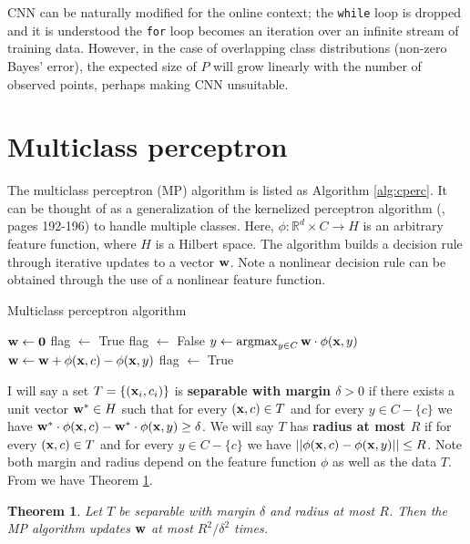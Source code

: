 \documentclass{article}
\newcommand{\R}{ \mbox{${\mathbb R}$}}
\newcommand{\argmax}{\operatornamewithlimits{argmax}}
\newtheorem{theorem}{Theorem}
\begin{document}
CNN can be naturally modified for the online context; the \texttt{while} loop is dropped and it is understood the \texttt{for} loop becomes an iteration over an infinite stream of training data. However, in the case of overlapping class distributions (non-zero Bayes' error), the expected size of $P$ will grow linearly with the number of observed points, perhaps making CNN unsuitable.

\section{Multiclass perceptron}
The multiclass perceptron (MP) algorithm \cite{CollinsPerceptron} is listed as Algorithm \ref{alg:cperc}. It can be thought of as a generalization of the kernelized perceptron algorithm (\cite{bishop-2006}, pages 192-196) to handle multiple classes. Here, $\phi:\R^d \times C \rightarrow H$ is an arbitrary feature function, where $H$ is a Hilbert space. The algorithm builds a decision rule through iterative updates to a vector ${\bf w}$. Note a nonlinear decision rule can be obtained through the use of a nonlinear feature function.

\begin{algorithm}
\caption{Multiclass perceptron algorithm}
\label{alg:cperc}
\begin{algorithmic}
\STATE ${\bf w} \leftarrow {\bf 0}$
\STATE flag $\leftarrow$ True
\STATE flag $\leftarrow$ False
	\STATE $y \gets \argmax_{y \in C} {\bf w} \cdot \phi({\bf x},y)$
		\STATE ${\bf w} \leftarrow {\bf w} + \phi({\bf x},c)-\phi({\bf x},y)$
		\STATE flag $\leftarrow$ True
	\ENDIF
\ENDFOR
\ENDWHILE
\end{algorithmic}
\end{algorithm}

I will say a set $T=\{({\bf x}_i,c_i)\}$ is \textbf{separable with margin $\delta > 0$} if there exists a unit vector ${\bf w}^* \in H$ such that for every $({\bf x},c) \in T$ and for every $y \in C-\{c\}$ we have ${\bf w}^* \cdot \phi({\bf x},c) - {\bf w}^* \cdot \phi({\bf x},y) \geq \delta$. We will say $T$ has \textbf{radius at most $R$} if for every $({\bf x},c) \in T$ and for every $y \in C-\{c\}$ we have $||\phi({\bf x},c) - \phi({\bf x},y)|| \leq R$. Note both margin and radius depend on the feature function $\phi$ as well as the data $T$. From \cite{CollinsPerceptron} we have Theorem \ref{thm:updates}.

\begin{theorem}
\label{thm:updates}
Let $T$ be separable with margin $\delta$ and radius at most $R$. Then the MP algorithm updates ${\bf w}$ at most $R^2/\delta^2$ times.
\end{theorem}
\end{document}
